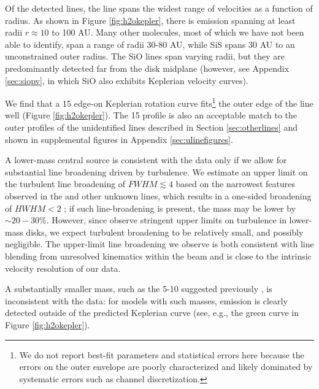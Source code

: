 \documentclass[twocolumn]{aastex61}
\begin{document}
Of the detected lines, the \water line spans the widest range of
velocities as a function of radius.  As shown in Figure \ref{fig:h2okepler},
there is \water emission spanning at least radii $r\approx 10$ to 100 AU.  Many
other molecules, most of
which we have not been able to identify, span a range of radii 30-80 AU, while SiS
spans 30 AU to an unconstrained outer radius.   The SiO lines span varying radii,
but they are predominantly detected far from the disk midplane (however,
see Appendix \ref{sec:siopv}, in which SiO also exhibits Keplerian velocity
curves).

We find that a 15 \msun edge-on Keplerian rotation curve fits\footnote{We do
not report best-fit parameters and statistical errors here because the errors
on the outer envelope are poorly characterized and likely dominated by
systematic errors such as channel discretization.} the outer edge of
the \water line well (Figure \ref{fig:h2okepler}).  The 15 \msun profile is
also an acceptable match to the outer profiles of the unidentified lines
described in Section \ref{sec:otherlines} and shown in supplemental figures in
Appendix \ref{sec:ulinefigures}.

A lower-mass central source is consistent with the \water data only if we allow
for substantial line broadening driven by turbulence.  We estimate an upper
limit on the turbulent line broadening of $FWHM\lesssim4$ \kms based on the
narrowest features observed in the \water and other unknown lines, which
results in a one-sided broadening of $HWHM<2$ \kms; if such line-broadening is
present, the mass may be lower by $\sim20-30\%$.
However, since \citet{Flaherty2017a} observe stringent upper limits on
turbulence in lower-mass disks, we expect turbulent broadening to be relatively
small, and possibly negligible.  The upper-limit line broadening we observe is
both consistent with line blending from unresolved kinematics within the beam
and is close to the intrinsic velocity resolution of our data.


A substantially smaller mass, such as the 5-10 \msun suggested previously
\citep{Plambeck2016a,Hirota2014a}, is inconsistent with the data: for models
with such masses, emission is clearly detected outside of the predicted
Keplerian curve (see, e.g., the green curve in Figure \ref{fig:h2okepler}).  
\end{document}
